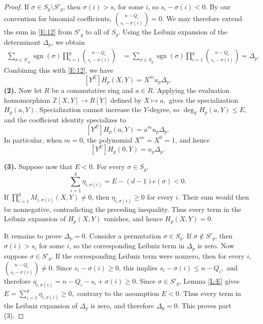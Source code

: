 \documentclass[10pt,a4paper]{amsart}
\newcommand{\Z}{\mathbb{Z}}
\begin{document}
\begin{proof}
If $\sigma\in S_g\setminus S'_g$, then $\sigma(i)>s_i$ for some $i$, so
$
s_i-\sigma(i)<0.
$
By our convention for binomial coefficients,
$
\binom{n-Q_i}{s_i-\sigma(i)}=0.
$
We may therefore extend the sum in \eqref{E:12} from $S'_g$ to all of $S_g$. Using the Leibniz expansion of the determinant $\Delta_p$, we obtain
$$
\begin{aligned}
\sum_{\sigma\in S'_g}
\operatorname{sgn}(\sigma)
\prod_{i=1}^{g}
\binom{n-Q_i}{s_i-\sigma(i)}
&=
\sum_{\sigma\in S_g}
\operatorname{sgn}(\sigma)
\prod_{i=1}^{g}
\binom{n-Q_i}{s_i-\sigma(i)}=
\Delta_p.
\end{aligned}
$$
Combining this with \eqref{E:12}, we have 
$$
[Y^E]H_p(X,Y)=X^m u_p\Delta_p.
$$
{\bf (2).} Now let $R$ be a commutative ring and $a\in R$.
Applying the evaluation homomorphism  
$
\Z[X,Y]\longrightarrow R[Y]$ defined by
$X\longmapsto a,$
gives the specialization $H_p(a,Y)$.
Specialization cannot increase the $Y$-degree, so
$
\deg_Y H_p(a,Y)\leq E,
$
and the coefficient identity specializes to
$$
[Y^E]H_p(a,Y)=a^m u_p\Delta_p.
$$
In particular, when $m=0$, the polynomial $X^m=X^0=1$, 
and hence 
$$[Y^E]H_p(0,Y)=u_p\Delta_p.$$

\noindent 
{\bf (3).} Suppose now that $E<0$. For every $\sigma\in S_g$, 
$$
\sum_{i=1}^{g}\eta_{i,\sigma(i)}
=E-(d-1)e(\sigma)<0.
$$
If $\prod_{i=1}^g M_{i,\sigma(i)}(X,Y)\ne 0$, then 
$\eta_{i,\sigma(i)}\geq0$ for every $i$. 
Their sum would then be nonnegative, contradicting the preceding inequality. Thus every term in the Leibniz expansion of $H_p(X,Y)$ vanishes, and hence
$
H_p(X,Y)=0.
$

It remains to prove $\Delta_p=0$.
Consider a permutation $\sigma\in S_g$.
If $\sigma\not\in S'_g$, then 
$\sigma(i)>s_i$ for some $i$, so the corresponding Leibniz term 
in $\Delta_p$ is zero.
Now suppose $\sigma\in S'_g$.
If the corresponding Leibniz term were nonzero, then for every $i$, 
$\binom{n-Q_i}{s_i-\sigma(i)}\ne 0$.
Since $s_i-\sigma(i)\ge 0$, this implies 
$s_i-\sigma(i)\le n-Q_i,$
and therefore
$\eta_{i,\sigma(i)}=n-Q_i-s_i+\sigma(i)\ge 0.$
Since $\sigma\in S'_g$, Lemma \ref{L:E} gives 
$
E=\sum_{i=1}^{g}\eta_{i,\sigma(i)}\geq0,
$
contrary to the assumption $E<0$. Thus every term in the Leibniz
expansion of $\Delta_p$ is zero, and therefore
$
\Delta_p=0.
$
This proves part (3).
\end{proof}
\end{document}
